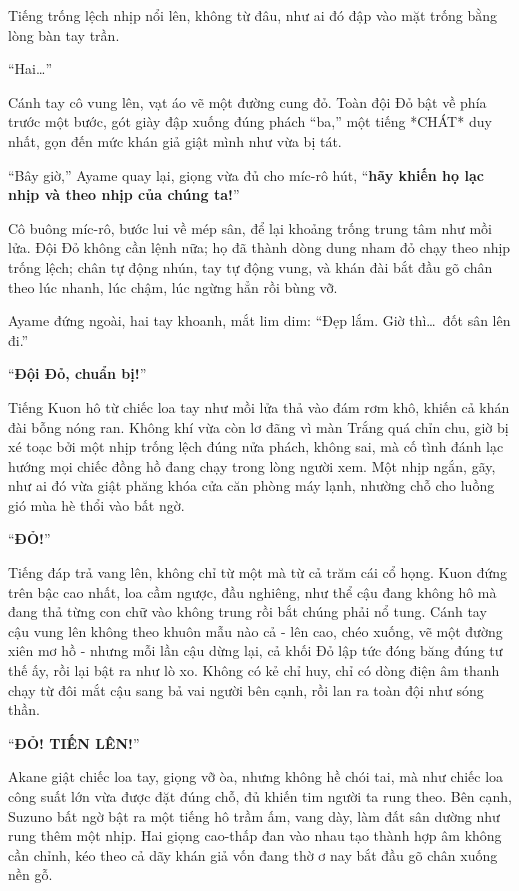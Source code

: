 \documentclass[../main.tex]{subfiles}
\begin{document}
Tiếng trống lệch nhịp nổi lên, không từ đâu, như ai đó đập vào mặt trống bằng lòng bàn tay trần.

``Hai\dots''

Cánh tay cô vung lên, vạt áo vẽ một đường cung đỏ. Toàn đội Đỏ bật về phía trước một bước, gót giày đập xuống đúng phách ``ba,'' một tiếng *CHÁT* duy nhất, gọn đến mức khán giả giật mình như vừa bị tát.

``Bây giờ,'' Ayame quay lại, giọng vừa đủ cho míc-rô hút, ``\textbf{hãy khiến họ lạc nhịp và theo nhịp của chúng ta!}''

Cô buông míc-rô, bước lui về mép sân, để lại khoảng trống trung tâm như mồi lửa. Đội Đỏ không cần lệnh nữa; họ đã thành dòng dung nham đỏ chạy theo nhịp trống lệch; chân tự động nhún, tay tự động vung, và khán đài bắt đầu gõ chân theo lúc nhanh, lúc chậm, lúc ngừng hẳn rồi bùng vỡ.

Ayame đứng ngoài, hai tay khoanh, mắt lim dim: ``Đẹp lắm. Giờ thì\dots\ đốt sân lên đi.''

``\textbf{Đội Đỏ, chuẩn bị!}''

Tiếng Kuon hô từ chiếc loa tay như mồi lửa thả vào đám rơm khô, khiến cả khán đài bỗng nóng ran. Không khí vừa còn lơ đãng vì màn Trắng quá chỉn chu, giờ bị xé toạc bởi một nhịp trống lệch đúng nửa phách, không sai, mà cố tình đánh lạc hướng mọi chiếc đồng hồ đang chạy trong lòng người xem. Một nhịp ngắn, gãy, như ai đó vừa giật phăng khóa cửa căn phòng máy lạnh, nhường chỗ cho luồng gió mùa hè thổi vào bất ngờ.

``\textbf{ĐỎ!}''

Tiếng đáp trả vang lên, không chỉ từ một mà từ cả trăm cái cổ họng. Kuon đứng trên bậc cao nhất, loa cầm ngược, đầu nghiêng, như thể cậu đang không hô mà đang thả từng con chữ vào không trung rồi bắt chúng phải nổ tung. Cánh tay cậu vung lên không theo khuôn mẫu nào cả - lên cao, chéo xuống, vẽ một đường xiên mơ hồ - nhưng mỗi lần cậu dừng lại, cả khối Đỏ lập tức đóng băng đúng tư thế ấy, rồi lại bật ra như lò xo. Không có kẻ chỉ huy, chỉ có dòng điện âm thanh chạy từ đôi mắt cậu sang bả vai người bên cạnh, rồi lan ra toàn đội như sóng thần.

``\textbf{ĐỎ! TIẾN LÊN!}''

Akane giật chiếc loa tay, giọng vỡ òa, nhưng không hề chói tai, mà như chiếc loa công suất lớn vừa được đặt đúng chỗ, đủ khiến tim người ta rung theo. Bên cạnh, Suzuno bất ngờ bật ra một tiếng hô trầm ấm, vang dày, làm đất sân dường như rung thêm một nhịp. Hai giọng cao-thấp đan vào nhau tạo thành hợp âm không cần chỉnh, kéo theo cả dãy khán giả vốn đang thờ ơ nay bắt đầu gõ chân xuống nền gỗ.
\end{document}
